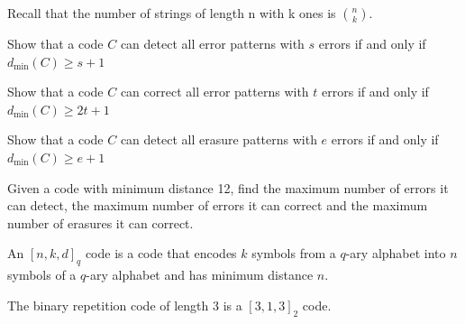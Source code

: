 Recall that the number of strings of length n with k ones is $n\choose k$.
\begin{exercise}
Show that a code $C$ can detect all error patterns with $s$ errors if and only if $d_{\min}(C)\geq s+1$
\end{exercise}
\begin{exercise}
Show that a code $C$ can correct all error patterns with $t$ errors if and only if $d_{\min}(C)\geq 2t+1$
\end{exercise}

\begin{exercise}
Show that a code $C$ can detect all erasure patterns with $e$ errors if and only if $d_{\min}(C)\geq e+1$
\end{exercise}

\begin{exercise}
Given a code with minimum distance 12, find the maximum number of errors it can detect, the maximum number of errors it can correct and the maximum number of erasures it can correct.
\end{exercise}

\begin{definition}
An $[n,k,d]_q$ code is a code that encodes $k$ symbols from a $q$-ary alphabet into $n$ symbols of a $q$-ary alphabet and has minimum distance $n$.
\end{definition}
\begin{example}
The binary repetition code of length 3 is a $[3,1,3]_2$ code.
\end{example}

